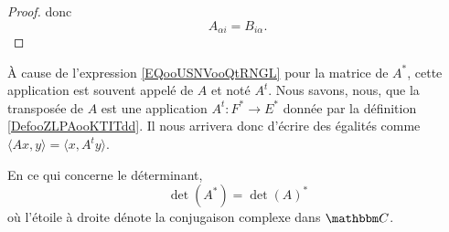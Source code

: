 \begin{proof}

donc
\begin{equation}
    A_{\alpha i}=B_{i \alpha}.
\end{equation}
\end{proof}

\begin{normaltext}
    À cause de l'expression \eqref{EQooUSNVooQtRNGL} pour la matrice de \( A^*\), cette application est souvent appelé  de \( A\) et noté \( A^t\). Nous savons, nous, que la transposée de \( A\) est une application \( A^t\colon F^*\to E^*\) donnée par la définition \ref{DefooZLPAooKTITdd}. Il nous arrivera donc d'écrire des égalités comme \( \langle Ax, y\rangle=\langle x, A^ty\rangle  \).
\end{normaltext}

\begin{proposition}     \label{PROPooSHZMooGwdfBd}
    En ce qui concerne le déterminant,
    \begin{equation}
        \det(A^*)=\det(A)^*
    \end{equation}
    où l'étoile à droite dénote la conjugaison complexe dans \( \eC\).
\end{proposition}

